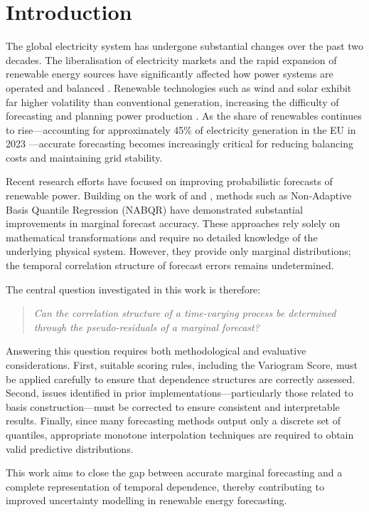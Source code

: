 \section{Introduction}

The global electricity system has undergone substantial changes over the past two decades. The liberalisation of electricity markets and the rapid expansion of renewable energy sources have significantly affected how power systems are operated and balanced \cite{castro2024a,europeancommission.directorategeneralforeconomicandfinancialaffairs.DevelopmentRenewableEnergy2023}. Renewable technologies such as wind and solar exhibit far higher volatility than conventional generation, increasing the difficulty of forecasting and planning power production \cite{castro2024a}. As the share of renewables continues to rise—accounting for approximately 45\% of electricity generation in the EU in 2023 \cite{europeancommission.directorategeneralforeconomicandfinancialaffairs.DevelopmentRenewableEnergy2023}—accurate forecasting becomes increasingly critical for reducing balancing costs and maintaining grid stability.

Recent research efforts have focused on improving probabilistic forecasts of renewable power. Building on the work of \textcite{jorgensenRealTimeForecastingRenewable2024} and \textcite{jorgensenSequentialMethodsError2025}, methods such as Non-Adaptive Basis Quantile Regression (NABQR) have demonstrated substantial improvements in marginal forecast accuracy. These approaches rely solely on mathematical transformations and require no detailed knowledge of the underlying physical system. However, they provide only marginal distributions; the temporal correlation structure of forecast errors remains undetermined.

The central question investigated in this work is therefore:

\begin{quote}
\emph{Can the correlation structure of a time-varying process be determined through the pseudo-residuals of a marginal forecast?}
\end{quote}

Answering this question requires both methodological and evaluative considerations. First, suitable scoring rules, including the Variogram Score, must be applied carefully to ensure that dependence structures are correctly assessed. Second, issues identified in prior implementations—particularly those related to basis construction—must be corrected to ensure consistent and interpretable results. Finally, since many forecasting methods output only a discrete set of quantiles, appropriate monotone interpolation techniques are required to obtain valid predictive distributions.

This work aims to close the gap between accurate marginal forecasting and a complete representation of temporal dependence, thereby contributing to improved uncertainty modelling in renewable energy forecasting.